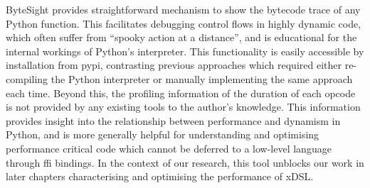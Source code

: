 ByteSight provides straightforward mechanism to show the bytecode trace of any Python function.
This facilitates debugging control flows in highly dynamic code, which often suffer from ``spooky action at a distance'', and is educational for the internal workings of Python's interpreter.
This functionality is easily accessible by installation from \ac{pypi}, contrasting previous approaches which required either re-compiling the Python interpreter or manually implementing the same approach each time.
Beyond this, the profiling information of the duration of each opcode is not provided by any existing tools to the author's knowledge. This information provides insight into the relationship between performance and dynamism in Python, and is more generally helpful for understanding and optimising performance critical code which cannot be deferred to a low-level language through \ac{ffi} bindings.
In the context of our research, this tool unblocks our work in later chapters characterising and optimising the performance of xDSL.
